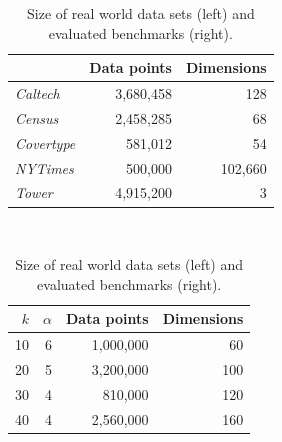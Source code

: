 %
\begin{center}
\begin{table}
	
\begin{minipage}{0.5\textwidth}
	\begin{tabular}{lrr}
		\toprule
        
		    & Data points
		    & Dimensions
            \\
		\midrule
		\textit{Caltech}
    		& 3,680,458
    		& 128
    		\\
		\textit{Census}
    		& 2,458,285
    		& 68
    		\\
	    \textit{Covertype}
    	    & 581,012
    		& 54
    		\\
	    \textit{NYTimes}
    	    & 500,000
    		& 102,660
    		\\
        \textit{Tower}
            & 4,915,200
    		& 3
    		\\
		\bottomrule
	\end{tabular}\\
\end{minipage}
\begin{minipage}{0.5\textwidth}
	\begin{tabular}{rrrr}
		\toprule
        $k$
		    & $\alpha$
		    & Data points
		    & Dimensions
            \\
		\midrule
        10
    		& 6
    		& 1,000,000
    		& 60
    		\\
        20
    		& 5
    		& 3,200,000
    		& 100
    		\\
        30
    		& 4
    		& 810,000
    		& 120
    		\\
        40
    		& 4
    		& 2,560,000
    		& 160
    		\\
		\bottomrule
	\end{tabular}\\
\end{minipage}
\caption{Size of real world data sets (left) and evaluated benchmarks (right).}
\label{tab:real-world-datasets-overview}
\end{table}
\end{center}


